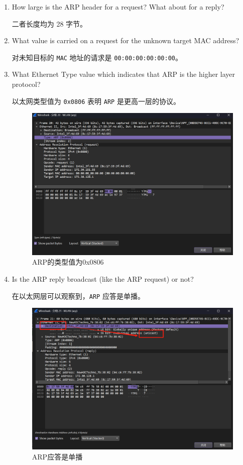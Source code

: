 \documentclass{article}
\begin{document}
\begin{enumerate}
		
		\item How large is the ARP header for a request? What about for a reply?
		
		二者长度均为 28 字节。
		
		\item What value is carried on a request for the unknown target MAC address?
		
		对未知目标的 \texttt{MAC} 地址的请求是 \texttt{00:00:00:00:00:00}。
		
		\item What Ethernet Type value which indicates that ARP is the higher layer protocol?
		
		以太网类型值为 \texttt{0x0806} 表明 \texttt{ARP} 是更高一层的协议。
		
		\begin{figure}[H]
			\centering
			\includegraphics[width=11cm]{images/10.ARP的类型值为0x0806.png}
			\caption{ARP的类型值为0x0806}
		\end{figure}
		
		\item Is the ARP reply broadcast (like the ARP request) or not?
		
		在以太网层可以观察到，\texttt{ARP} 应答是单播。
		
		\begin{figure}[H]
			\centering
			\includegraphics[width=11cm]{images/11.ARP应答是单播.png}
			\caption{ARP应答是单播}
		\end{figure}
		
	\end{enumerate}
	
\end{document}
